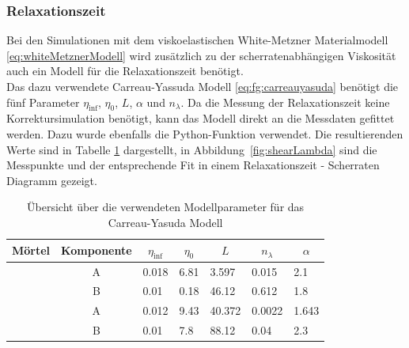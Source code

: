 \subsubsection{Relaxationszeit}
Bei den Simulationen mit dem viskoelastischen White-Metzner Materialmodell \eqref{eq:whiteMetznerModell} wird zusätzlich zu der scherratenabhängigen Viskosität auch ein Modell für die Relaxationszeit benötigt.\\
Das dazu verwendete Carreau-Yassuda Modell \eqref{eq:fg:carreauyasuda} benötigt die fünf Parameter $\eta_{\inf}$, $\eta_0$, $L$, $\alpha$ und $n_{\lambda}$. Da die Messung der Relaxationszeit keine Korrektursimulation benötigt, kann das Modell direkt an die Messdaten gefittet werden.
Dazu wurde ebenfalls die Python-Funktion  verwendet. Die resultierenden Werte sind in Tabelle \ref{fig:relaxParameter} dargestellt, in Abbildung~\ref{fig:shearLambda} sind die Messpunkte und der entsprechende Fit in einem Relaxationszeit - Scherraten Diagramm gezeigt.
\begin{table}
    \centering
    \begin{tabular}{l c l l l l l}
        \textbf{Mörtel} & 
        \textbf{Komponente} & 
        \multicolumn{1}{c}{$\eta_{\inf}$} & 
        \multicolumn{1}{c}{$\eta_0$} &
        \multicolumn{1}{c}{$L$} & 
        \multicolumn{1}{c}{$n_{\lambda}$} & 
        \multicolumn{1}{c}{$\alpha$} \\
        \hline
        \hline
        \multirow{2}{*}{\hit{}} & A & 0.018   & 6.81  & 3.597 & 0.015 & 2.1       \\ 
                                & B & 0.01  & 0.18  & 46.12 & 0.612 & 1.8     \\ 
        \hline
        \multirow{2}{*}{\re{}}  & A & 0.012 & 9.43 & 40.372  & 0.0022 & 1.643    \\ 
                                & B & 0.01   & 7.8  & 88.12  & 0.04 & 2.3         
    \end{tabular}
    \caption{Übersicht über die verwendeten Modellparameter für das Carreau-Yasuda Modell}
    \label{fig:relaxParameter}
\end{table}
%

